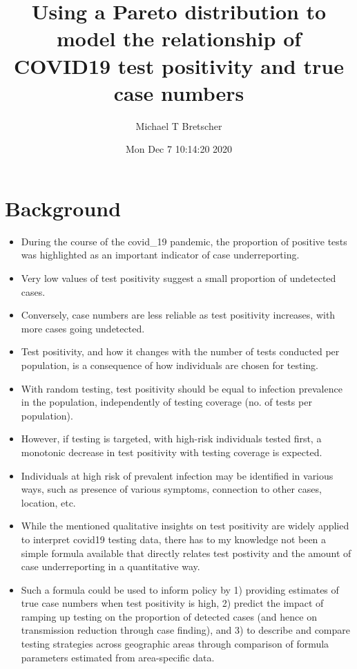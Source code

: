 \documentclass[
]{article}
\title{Using a Pareto distribution to model the relationship of COVID19
test positivity and true case numbers}
\author{Michael T Bretscher}
\date{Mon Dec 7 10:14:20 2020}
\begin{document}
\maketitle

\hypertarget{background}{%
\section{Background}\label{background}}

\begin{itemize}
\item
  During the course of the covid\_19 pandemic, the proportion of
  positive tests was highlighted as an important indicator of case
  underreporting.
\item
  Very low values of test positivity suggest a small proportion of
  undetected cases.
\item
  Conversely, case numbers are less reliable as test positivity
  increases, with more cases going undetected.
\item
  Test positivity, and how it changes with the number of tests conducted
  per population, is a consequence of how individuals are chosen for
  testing.
\item
  With random testing, test positivity should be equal to infection
  prevalence in the population, independently of testing coverage (no.
  of tests per population).
\item
  However, if testing is targeted, with high-risk individuals tested
  first, a monotonic decrease in test positivity with testing coverage
  is expected.
\item
  Individuals at high risk of prevalent infection may be identified in
  various ways, such as presence of various symptoms, connection to
  other cases, location, etc.
\item
  While the mentioned qualitative insights on test positivity are widely
  applied to interpret covid19 testing data, there has to my knowledge
  not been a simple formula available that directly relates test
  postivity and the amount of case underreporting in a quantitative way.
\item
  Such a formula could be used to inform policy by 1) providing
  estimates of true case numbers when test positivity is high, 2)
  predict the impact of ramping up testing on the proportion of detected
  cases (and hence on transmission reduction through case finding), and
  3) to describe and compare testing strategies across geographic areas
  through comparison of formula parameters estimated from area-specific
  data.
\end{itemize}
\end{document}
